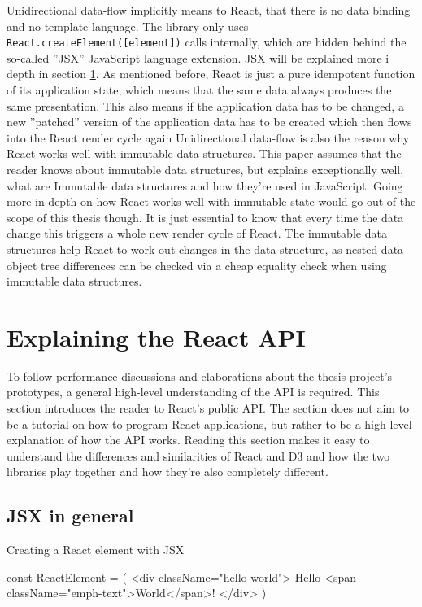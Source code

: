 Unidirectional data-flow implicitly means to React, that there is no data binding and no template language. The library only uses \texttt{React.createElement([element])} calls internally, which are hidden behind the so-called ''JSX'' JavaScript language extension. JSX will be explained more i depth in section \ref{sec:reactApi}. As mentioned before, React is just a pure idempotent function of its application state, which means that the same data always produces the same presentation. This also means if the application data has to be changed, a new ''patched'' version of the application data has to be created which then flows into the React render cycle again Unidirectional data-flow is also the reason why React works well with immutable data structures. This paper assumes that the reader knows about immutable data structures, but \cite{ImmutableJS} explains exceptionally well, what are Immutable data structures and how they're used in JavaScript. Going more in-depth on how React works well with immutable state would go out of the scope of this thesis though. It is just essential to know that every time the data change this triggers a whole new render cycle of React. The immutable data structures help React to work out changes in the data structure, as nested data object tree differences can be checked via a cheap equality check when using immutable data structures.

\section{Explaining the React API}
\label{sec:reactApi}

To follow performance discussions and elaborations about the thesis project's prototypes, a general high-level understanding of the API is required. This section introduces the reader to React's public API. The section does not aim to be a tutorial on how to program React applications, but rather to be a high-level explanation of how the API works. Reading this section makes it easy to understand the differences and similarities of React and D3 and how the two libraries play together and how they're also completely different.

\subsection{JSX in general}

\begin{program}
\caption{Creating a React element with JSX} 
\label{prog:reactJsxElement}
\begin{JsCode}
const ReactElement = (
  <div className="hello-world">
    Hello <span className="emph-text">World</span>!
  </div>
)
\end{JsCode}
\end{program}

